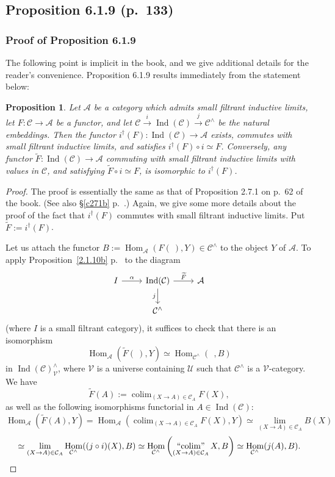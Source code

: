 \documentclass[12pt]{article}
\newtheorem{prop}[thm]{Proposition}
\theoremstyle{remark}
\theoremstyle{definition}
\newcommand{\A}{\mathcal A}
\newcommand{\C}{\mathcal C}
\newcommand{\U}{\mathcal U}
\newcommand{\V}{\mathcal V}
\newcommand{\xr}{\xrightarrow}
\DeclareMathOperator*{\colim}{colim}
\DeclareMathOperator*{\icolim}{``\!\colim\!"}
\DeclareMathOperator{\Hom}{Hom}
\DeclareMathOperator{\Ind}{Ind}
\begin{document}

\subsection{Proposition 6.1.9 (p.~133)} 

\subsubsection{Proof of Proposition 6.1.9}

The following point is implicit in the book, and we give additional details for the reader's convenience. Proposition 6.1.9 results immediately from the statement below:

\begin{prop} 
Let $\A$ be a category which admits small filtrant inductive limits, let $F:\C\to\A$ be a functor, and let $\C\xr i\Ind(\C)\xr j\C^\wedge$ be the natural embeddings. Then the functor $i^\dagger(F):\Ind(\C)\to\A$ exists, commutes with small filtrant inductive limits, and satisfies $i^\dagger(F)\circ i\simeq F$. Conversely, any functor $\widetilde F:\Ind(\C)\to\A$ commuting with small filtrant inductive limits with values in $\C$, and satisfying $\widetilde F\circ i\simeq F$, is isomorphic to $i^\dagger(F)$. 
\end{prop} 

\begin{proof}
The proof is essentially the same as that of Proposition 2.7.1 on p.~62 of the book. (See also \S\ref{c271b} p.~\pageref{c271b}.) Again, we give some more details about the proof of the fact that $i^\dagger(F)$ commutes with small filtrant inductive limits. Put $\widetilde F:=i^\dagger(F)$. 

Let us attach the functor $B:=\Hom_\A(F(\ ),Y)\in\C^\wedge$ to the object $Y$ of $\A$. To apply Proposition~\ref{2.1.10b} p.~\pageref{2.1.10b} to the diagram 
$$
\begin{tikzcd}
I\ar{r}{\alpha}&\Ind(\C)\ar{d}[swap]{j}\ar{r}{\widetilde F}&\A\\
&\C^\wedge
\end{tikzcd}
$$
(where $I$ is a small filtrant category), it suffices to check that there is an isomorphism 
$$
\Hom_\A\left(\widetilde F(\ ),Y\right)\simeq
\Hom_{\C^\wedge}(\ \ ,B)
$$ 
in $\Ind(\C)^\wedge_\V$, where $\V$ is a universe containing $\U$ such that $\C^\wedge$ is a $\V$-category. We have 
$$
\widetilde F(A):=\colim_{(X\to A)\in\C_A}F(X),
$$ 
as well as the following isomorphisms functorial in $A\in\Ind(\C)$:
$$
\Hom_\A\left(\widetilde F(A),Y\right)=
\Hom_\A\left(\colim_{(X\to A)\in\C_A}F(X),Y\right)\simeq
\lim_{(X\to A)\in\C_A}B(X)
$$
$$
\simeq
\lim_{(X\to A)\in\C_A}\Hom_{\C^\wedge}((j\circ i)(X),B)
\simeq
\Hom_{\C^\wedge}\left(\icolim_{(X\to A)\in\C_A}X,B\right)\simeq
\Hom_{\C^\wedge}(j(A),B).
$$
\end{proof}
\end{document}
